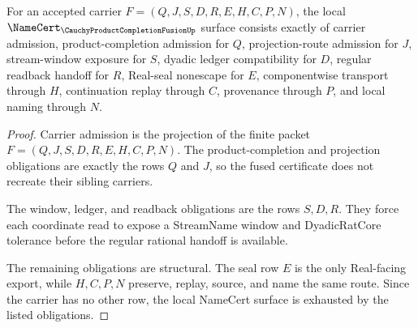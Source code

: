 \begin{theorem}
\label{thm:cauchy-product-completion-fusion-namecert-obligations}
For an accepted carrier $F=(Q,J,S,D,R,E,H,C,P,N)$, the local
$\NameCert_{\CauchyProductCompletionFusionUp}$ surface consists exactly of
carrier admission, product-completion admission for $Q$, projection-route
admission for $J$, stream-window exposure for $S$, dyadic ledger compatibility
for $D$, regular readback handoff for $R$, Real-seal nonescape for $E$,
componentwise transport through $H$, continuation replay through $C$,
provenance through $P$, and local naming through $N$.
\end{theorem}
\begin{proof}
Carrier admission is the projection of the finite packet
$F=(Q,J,S,D,R,E,H,C,P,N)$. The product-completion and projection obligations
are exactly the rows $Q$ and $J$, so the fused certificate does not recreate
their sibling carriers.

The window, ledger, and readback obligations are the rows $S,D,R$. They force
each coordinate read to expose a StreamName window and DyadicRatCore tolerance
before the regular rational handoff is available.

The remaining obligations are structural. The seal row $E$ is the only
Real-facing export, while $H,C,P,N$ preserve, replay, source, and name the same
route. Since the carrier has no other row, the local NameCert surface is
exhausted by the listed obligations.
\end{proof}


\begin{closurestatus}{\CauchyProductCompletionFusionUp}
  \theoryclosure{\seedClosure}
  \formalstatus{\unformalizedV}
\end{closurestatus}
